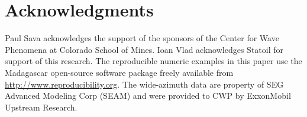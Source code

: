 \section{Acknowledgments}
Paul Sava acknowledges the support of the sponsors of the Center for
Wave Phenomena at Colorado School of Mines. Ioan Vlad acknowledges
Statoil for support of this research.
%
The reproducible numeric examples in this paper use the Madagascar
open-source software package freely available from
\url{http://www.reproducibility.org}.
%
The
wide-azimuth data are property of SEG Advanced Modeling Corp (SEAM) and
were provided to CWP by ExxonMobil Upstream Research.
%
